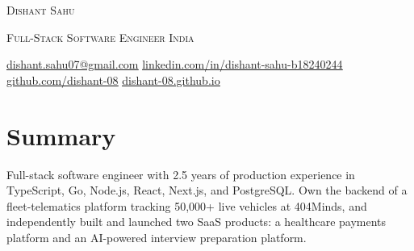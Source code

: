 \documentclass[letterpaper,11pt]{article}
\begin{document}
\begin{center}
  {\Huge\scshape Dishant Sahu}\par\vspace{3pt}
  {\scshape Full-Stack Software Engineer \textbar{} India}\par\vspace{4pt}
  {\small
  \href{mailto:dishant.sahu07@gmail.com}{\underline{dishant.sahu07@gmail.com}} \textbar{}
  \href{https://www.linkedin.com/in/dishant-sahu-b18240244/}{\underline{linkedin.com/in/dishant-sahu-b18240244}} \textbar{}
  \href{https://github.com/dishant-08}{\underline{github.com/dishant-08}} \textbar{}
  \href{https://dishant-08.github.io/}{\underline{dishant-08.github.io}}}
\end{center}
\vspace{-8pt}

\section{Summary}
Full-stack software engineer with 2.5 years of production experience in TypeScript, Go, Node.js, React,
Next.js, and PostgreSQL. Own the backend of a fleet-telematics platform tracking 50,000+ live vehicles at
404Minds, and independently built and launched two SaaS products: a healthcare payments platform and an
AI-powered interview preparation platform.

\end{document}
